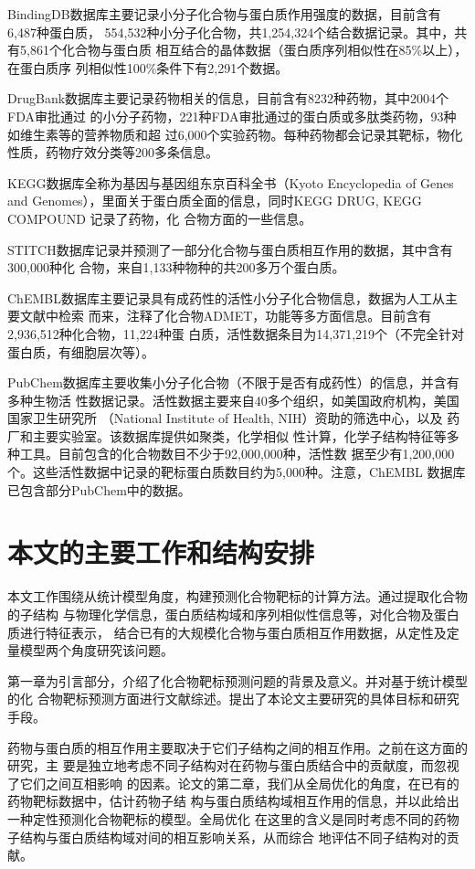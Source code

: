 BindingDB数据库主要记录小分子化合物与蛋白质作用强度的数据，目前含有6,487种蛋白质，
554,532种小分子化合物，共1,254,324个结合数据记录。其中，共有5,861个化合物与蛋白质
相互结合的晶体数据（蛋白质序列相似性在85\%以上），在蛋白质序
列相似性100\%条件下有2,291个数据。

DrugBank数据库主要记录药物相关的信息，目前含有8232种药物，其中2004个FDA审批通过
的小分子药物，221种FDA审批通过的蛋白质或多肽类药物，93种如维生素等的营养物质和超
过6,000个实验药物。每种药物都会记录其靶标，物化性质，药物疗效分类等200多条信息。

KEGG数据库全称为基因与基因组东京百科全书（Kyoto Encyclopedia of Genes and
Genomes），里面关于蛋白质全面的信息，同时KEGG DRUG, KEGG COMPOUND 记录了药物，化
合物方面的一些信息。

STITCH数据库记录并预测了一部分化合物与蛋白质相互作用的数据，其中含有300,000种化
合物，来自1,133种物种的共200多万个蛋白质。

ChEMBL数据库主要记录具有成药性的活性小分子化合物信息，数据为人工从主要文献中检索
而来，注释了化合物ADMET，功能等多方面信息。目前含有2,936,512种化合物，11,224种蛋
白质，活性数据条目为14,371,219个（不完全针对蛋白质，有细胞层次等）。

PubChem数据库主要收集小分子化合物（不限于是否有成药性）的信息，并含有多种生物活
性数据记录。活性数据主要来自40多个组织，如美国政府机构，美国国家卫生研究所
（National Institute of Health, NIH）资助的筛选中心，以及
药厂和主要实验室。该数据库提供如聚类，化学相似
性计算，化学子结构特征等多种工具。目前包含的化合物数目不少于92,000,000种，活性数
据至少有1,200,000个。这些活性数据中记录的靶标蛋白质数目约为5,000种。注意，ChEMBL
数据库已包含部分PubChem中的数据。

\section{本文的主要工作和结构安排}
本文工作围绕从统计模型角度，构建预测化合物靶标的计算方法。通过提取化合物的子结构
与物理化学信息，蛋白质结构域和序列相似性信息等，对化合物及蛋白质进行特征表示，
结合已有的大规模化合物与蛋白质相互作用数据，从定性及定量模型两个角度研究该问题。

第一章为引言部分，介绍了化合物靶标预测问题的背景及意义。并对基于统计模型的化
合物靶标预测方面进行文献综述。提出了本论文主要研究的具体目标和研究手段。

药物与蛋白质的相互作用主要取决于它们子结构之间的相互作用。之前在这方面的研究，主
要是独立地考虑不同子结构对在药物与蛋白质结合中的贡献度，而忽视了它们之间互相影响
的因素。论文的第二章，我们从全局优化的角度，在已有的药物靶标数据中，估计药物子结
构与蛋白质结构域相互作用的信息，并以此给出一种定性预测化合物靶标的模型。全局优化
在这里的含义是同时考虑不同的药物子结构与蛋白质结构域对间的相互影响关系，从而综合
地评估不同子结构对的贡献。

